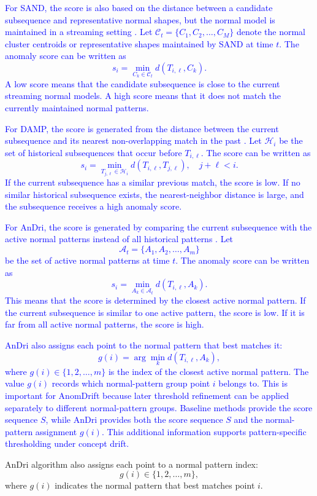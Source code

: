 \textcolor{blue}{For SAND, the score is also based on the distance between a candidate subsequence and representative normal shapes, but the normal model is maintained in a streaming setting \citep{boniol2021sand}. Let \(\mathcal{C}_t=\{C_1,C_2,\ldots,C_M\}\) denote the normal cluster centroids or representative shapes maintained by SAND at time \(t\). The anomaly score can be written as
\[s_i=\min_{C_k\in\mathcal{C}_t} d(T_{i,\ell},C_k).\]
A low score means that the candidate subsequence is close to the current streaming normal models. A high score means that it does not match the currently maintained normal patterns.}

\textcolor{blue}{For DAMP, the score is generated from the distance between the current subsequence and its nearest non-overlapping match in the past \citep{lu2022damp}. Let \(\mathcal{H}_i\) be the set of historical subsequences that occur before \(T_{i,\ell}\). The score can be written as
\[s_i=\min_{T_{j,\ell}\in\mathcal{H}_i} d(T_{i,\ell},T_{j,\ell}), \quad j+\ell<i.\]
If the current subsequence has a similar previous match, the score is low. If no similar historical subsequence exists, the nearest-neighbor distance is large, and the subsequence receives a high anomaly score. }

\textcolor{blue}{For AnDri, the score is generated by comparing the current subsequence with the active normal patterns instead of all historical patterns \citep{park2025adaptive}. Let
\[\mathcal{A}_t=\{A_1,A_2,\ldots,A_m\}\]
be the set of active normal patterns at time \(t\). The anomaly score can be written as
\[s_i=\min_{A_k\in\mathcal{A}_t} d(T_{i,\ell},A_k).\]
This means that the score is determined by the closest active normal pattern. If the current subsequence is similar to one active pattern, the score is low. If it is far from all active normal patterns, the score is high.}

\textcolor{blue}{
AnDri also assigns each point to the normal pattern that best matches it:
\[g(i)=\arg\min_{k} d(T_{i,\ell},A_k),\]
where \(g(i)\in\{1,2,\ldots,m\}\) is the index of the closest active normal pattern. The value \(g(i)\) records which normal-pattern group point \(i\) belongs to. This is important for AnomDrift because later threshold refinement can be applied separately to different normal-pattern groups. Baseline methods provide the score sequence \(S\), while AnDri provides both the score sequence \(S\) and the normal-pattern assignment \(g(i)\). This additional information supports pattern-specific thresholding under concept drift.}




AnDri algorithm also assigns each point to a normal pattern index:
\[g(i) \in \{1,2,\ldots,m\},\]
where \(g(i)\) indicates the normal pattern that best matches point \(i\). 


